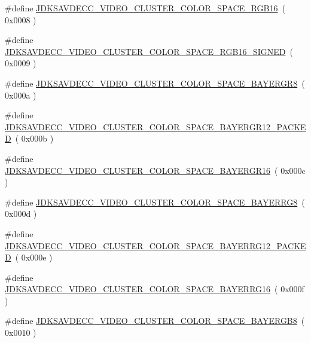 \begin{DoxyCompactItemize}
\item 
\#define \hyperlink{group__video__cluster__color__space_gaf33cfa5b359efab9bcc244d360cc4510}{J\+D\+K\+S\+A\+V\+D\+E\+C\+C\+\_\+\+V\+I\+D\+E\+O\+\_\+\+C\+L\+U\+S\+T\+E\+R\+\_\+\+C\+O\+L\+O\+R\+\_\+\+S\+P\+A\+C\+E\+\_\+\+R\+G\+B16}~( 0x0008 )
\item 
\#define \hyperlink{group__video__cluster__color__space_ga45feda4f7d5d508006bd7982eb5555c6}{J\+D\+K\+S\+A\+V\+D\+E\+C\+C\+\_\+\+V\+I\+D\+E\+O\+\_\+\+C\+L\+U\+S\+T\+E\+R\+\_\+\+C\+O\+L\+O\+R\+\_\+\+S\+P\+A\+C\+E\+\_\+\+R\+G\+B16\+\_\+\+S\+I\+G\+N\+ED}~( 0x0009 )
\item 
\#define \hyperlink{group__video__cluster__color__space_gac8ea820315760eac4a19bcd8c12655f8}{J\+D\+K\+S\+A\+V\+D\+E\+C\+C\+\_\+\+V\+I\+D\+E\+O\+\_\+\+C\+L\+U\+S\+T\+E\+R\+\_\+\+C\+O\+L\+O\+R\+\_\+\+S\+P\+A\+C\+E\+\_\+\+B\+A\+Y\+E\+R\+G\+R8}~( 0x000a )
\item 
\#define \hyperlink{group__video__cluster__color__space_ga7cf0989191db299ea9332edcbcc49da6}{J\+D\+K\+S\+A\+V\+D\+E\+C\+C\+\_\+\+V\+I\+D\+E\+O\+\_\+\+C\+L\+U\+S\+T\+E\+R\+\_\+\+C\+O\+L\+O\+R\+\_\+\+S\+P\+A\+C\+E\+\_\+\+B\+A\+Y\+E\+R\+G\+R12\+\_\+\+P\+A\+C\+K\+ED}~( 0x000b )
\item 
\#define \hyperlink{group__video__cluster__color__space_gac8aa87242f4a3a0b1495931183d17586}{J\+D\+K\+S\+A\+V\+D\+E\+C\+C\+\_\+\+V\+I\+D\+E\+O\+\_\+\+C\+L\+U\+S\+T\+E\+R\+\_\+\+C\+O\+L\+O\+R\+\_\+\+S\+P\+A\+C\+E\+\_\+\+B\+A\+Y\+E\+R\+G\+R16}~( 0x000c )
\item 
\#define \hyperlink{group__video__cluster__color__space_gae3bff09b4fca02b48eb4e9df350103b8}{J\+D\+K\+S\+A\+V\+D\+E\+C\+C\+\_\+\+V\+I\+D\+E\+O\+\_\+\+C\+L\+U\+S\+T\+E\+R\+\_\+\+C\+O\+L\+O\+R\+\_\+\+S\+P\+A\+C\+E\+\_\+\+B\+A\+Y\+E\+R\+R\+G8}~( 0x000d )
\item 
\#define \hyperlink{group__video__cluster__color__space_gac99ddf5787e9a221f8a40e95e98bee89}{J\+D\+K\+S\+A\+V\+D\+E\+C\+C\+\_\+\+V\+I\+D\+E\+O\+\_\+\+C\+L\+U\+S\+T\+E\+R\+\_\+\+C\+O\+L\+O\+R\+\_\+\+S\+P\+A\+C\+E\+\_\+\+B\+A\+Y\+E\+R\+R\+G12\+\_\+\+P\+A\+C\+K\+ED}~( 0x000e )
\item 
\#define \hyperlink{group__video__cluster__color__space_ga60ca7fa49e3f6ab22dee47d2cbea561d}{J\+D\+K\+S\+A\+V\+D\+E\+C\+C\+\_\+\+V\+I\+D\+E\+O\+\_\+\+C\+L\+U\+S\+T\+E\+R\+\_\+\+C\+O\+L\+O\+R\+\_\+\+S\+P\+A\+C\+E\+\_\+\+B\+A\+Y\+E\+R\+R\+G16}~( 0x000f )
\item 
\#define \hyperlink{group__video__cluster__color__space_gac3f9c08c97386c1ec7aea9f4a20aa5eb}{J\+D\+K\+S\+A\+V\+D\+E\+C\+C\+\_\+\+V\+I\+D\+E\+O\+\_\+\+C\+L\+U\+S\+T\+E\+R\+\_\+\+C\+O\+L\+O\+R\+\_\+\+S\+P\+A\+C\+E\+\_\+\+B\+A\+Y\+E\+R\+G\+B8}~( 0x0010 )

\end{DoxyCompactItemize}
